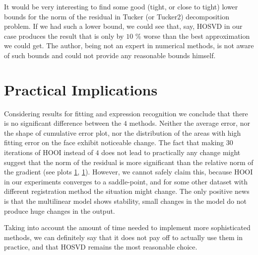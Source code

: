 It would be very interesting to find some good (tight, or close to tight) lower bounds for 
the norm of the residual in Tucker (or Tucker2) decomposition problem.
If we had such a lower bound, we could see that, say, HOSVD in our
case produces the result that is only by $10 $ \% worse than the 
best approximation we could get. The author, being not an expert in 
numerical methods, is not aware of such bounds and could not provide 
any reasonable bounds himself.


\section{Practical Implications}

Considering results for fitting and expression recognition
we conclude that there is no significant difference between the $4$ methods.
Neither the average error, nor the shape of cumulative error plot, nor
the distribution of the areas with high fitting error on the face exhibit
noticeable change. The fact
that making $30$ iterations of HOOI instead of $4$ does not lead to practically any 
change might suggest that the norm of the residual is more significant than
the relative norm of the gradient (see plots \ref{}, \ref{}). However,
we cannot safely claim this, because HOOI in our experiments
converges to a saddle-point, and for some other dataset with
different registration method the situation might change.
The only positive news is that the multilinear model
shows stability, small changes in the model do not produce huge
changes in the output.


Taking into account the amount of time needed to implement
more sophisticated methods, we can definitely say
that it does not pay off to actually use them in practice,
and that HOSVD remains the most reasonable choice.
